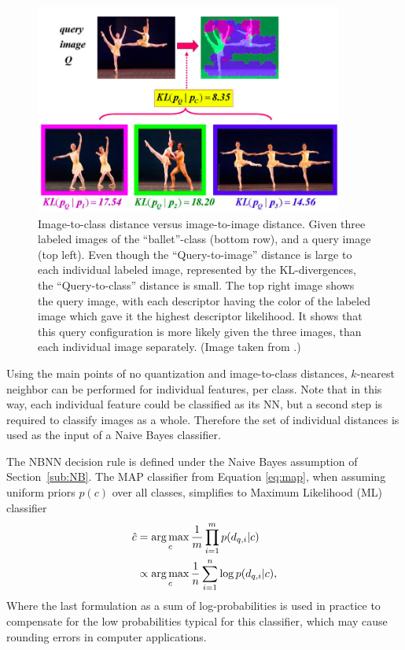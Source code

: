 \begin{figure}[hbt]
    \centering
    \includegraphics[width=0.9\textwidth]{Im2imVsIm2cl}
    \caption{Image-to-class distance versus image-to-image distance. Given three labeled images of the ``ballet''-class (bottom row), and a query image (top left). Even though the ``Query-to-image'' distance is large to each individual labeled image, represented by the KL-divergences, the ``Query-to-class'' distance is small. The top right image shows the query image, with each descriptor having the color of the labeled image which gave it the highest descriptor likelihood. It shows that this query configuration is more likely given the three images, than each individual image separately. (Image taken from \cite{boiman2008defense, irani2006similarity}.)}
    \label{fig:im2im_vs_im2cl}
\end{figure}

Using the main points of no quantization and image-to-class distances, $k$-nearest neighbor can be performed for individual features, per class. Note that in this way, each individual feature could be classified as its NN, but a second step is required to classify images as a whole. Therefore the set of individual distances is used as the input of a Naive Bayes classifier.

The NBNN decision rule is defined under the Naive Bayes assumption of Section~\ref{sub:NB}. The MAP classifier from Equation \eqref{eq:map}, when assuming uniform priors $p(c)$ over all classes, simplifies to Maximum Likelihood (ML) classifier 
\begin{align}
    \hat c &= \operatorname*{arg\,max}_c \frac{1}{m}\prod_{i=1}^{m} p(d_{q,i}|c)\\
           &\propto \operatorname*{arg\,max}_c \frac{1}{n}\sum_{i=1}^{n} \log p(d_{q,i}|c),
\end{align}
Where the last formulation as a sum of log-probabilities is used in practice to compensate for the low probabilities typical for this classifier, which may cause rounding errors in computer applications.

